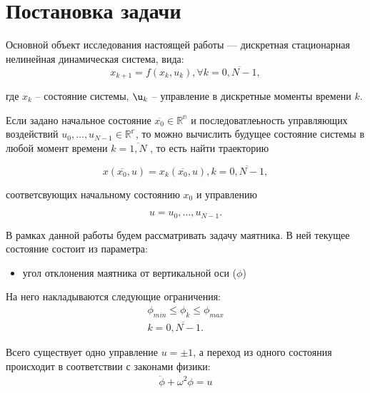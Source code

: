 \section{Постановка задачи}\label{1sec:task}

Основной объект исследования настоящей работы — дискретная стационарная нелинейная динамическая система, вида:
\begin{equation}
	x_{k+1} = f(x_k, u_k), \forall k = \overline{0, N-1}, 
\end{equation}

где $x_k$ -- состояние системы, $\u_k$ -- управление в дискретные моменты времени $k$.

Если задано начальное состояние $\overline{x_0}\in \mathbb{R^n}$ и последоватлеьность управляющих воздействий $u_0, \dots , u_{N-1} \in \mathbb{R^r}$, то можно вычислить будущее состояние системы в любой момент времени $k=\overline{1, N}$ , то есть найти траекторию 

\begin{equation}
	x(\overline{x_0}, u) = {x_k(\overline{x_0}, u), k = \overline{0, N-1}},  
\end{equation}

соответсвующих начальному состоянию $x_0$ и управлению 

\begin{equation}
	u = {u_0, \dots, u_{N-1}}.
\end{equation}

В рамках данной работы будем рассматривать задачу маятника. В ней текущее состояние состоит из параметра:

\begin{itemize}
	\item угол отклонения маятника от вертикальной оси ($\phi$)
\end{itemize}

На него накладываются следующие ограничения:
\begin{equation}
	\begin{aligned}
		\phi_{min} \leq \phi_k \leq \phi_{max} \\
		k = \overline{0, N-1}.
	\end{aligned}
	\label{eq:pend}
\end{equation}

Всего существует одно  управление $u = \pm 1$, а переход из одного состояния происходит в соответствии с законами физики:
\begin{equation}
	\begin{aligned}
		\ddot{\phi} + \omega^2 \phi = u 
	\end{aligned}
\end{equation}

